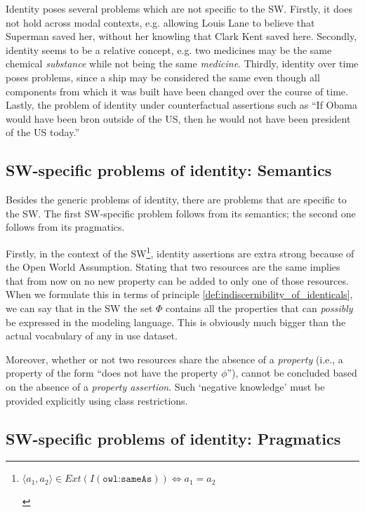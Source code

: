 Identity poses several problems which are not specific to the SW.
Firstly, it does not hold across modal contexts,
e.g. allowing Louis Lane to believe that Superman saved her,
without her knowling that Clark Kent saved here.
Secondly, identity seems to be a relative concept\cite{Geach},
e.g. two medicines may be the same chemical \emph{substance}
while not being the same \emph{medicine}.
Thirdly, identity over time poses problems,
since a ship may be considered the same
even though all components from which it was built
have been changed over the course of time.\cite{}
Lastly, the problem of identity under counterfactual assertions
such as ``If Obama would have been bron outside of the US,
then he would not have been president of the US today.''\cite{Kripke1980}

\subsection{SW-specific problems of identity: Semantics}

Besides the generic problems of identity,
there are problems that are specific to the SW.
The first SW-specific problem follows from its semantics;
the second one follows from its pragmatics.

Firstly, in the context of the SW\footnote{
\begin{definition}
\label{def:owl_sameAs}
$\langle a_1, a_2 \rangle \in Ext(I(\texttt{owl:sameAs})) \iff a_1 = a_2$
\end{definition}
},
identity assertions are extra strong
because of the Open World Assumption.
Stating that two resources are the same
implies that from now on no new property can be added
to only one of those resources.
When we formulate this in terms of
principle \ref{def:indiscernibility_of_identicals},
we can say that in the SW the set $\Phi$ contains
all the properties that can \emph{possibly} be expressed
in the modeling language.
This is obviously much bigger than the actual vocabulary
of any in use dataset.

Moreover, whether or not two resources share the absence of a \emph{property}
(i.e., a property of the form ``does not have the property $\phi$''),
cannot be concluded based on the absence of a \emph{property assertion}.
Such `negative knowledge' must be provided explicitly
using class restrictions.

\subsection{SW-specific problems of identity: Pragmatics}

